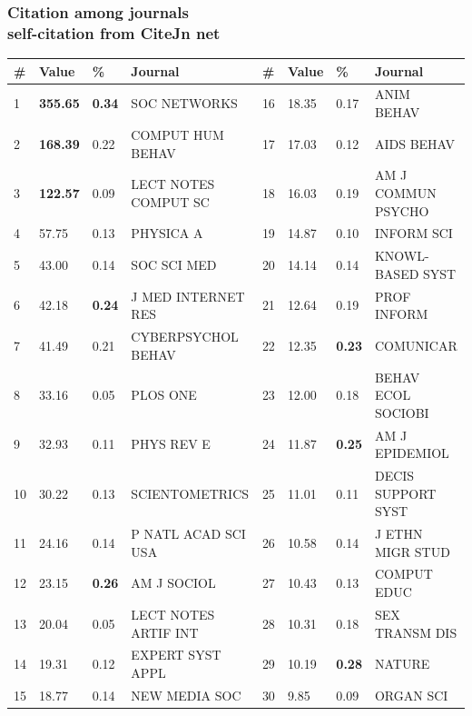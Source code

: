 \documentclass[hyperref={pdfstartview={FitBH -32768},
                         pdfpagemode=FullScreen,
                         plainpages=false,
                         colorlinks=true}
              ]{beamer}
\begin{document}
\begin{frame}[fragile]
\frametitle{Citation among journals\\ \normalsize self-citation from CiteJn net}

\renewcommand{\arraystretch}{0.95}
\tiny
\begin{center}
\begin{tabular}{p{0.1cm}|p{0.5cm}|p{0.3cm}|p{2.7cm}|p{0.1cm}|p{0.5cm}|p{0.3cm}|p{2.6cm}|} 
\# &	Value& \% &	Journal &  \# &	Value& \% & Journal \\ \hline 
1 &	\textbf{355.65}&	\textbf{0.34}&	SOC NETWORKS&	16&	       18.35 &    0.17	  &     ANIM BEHAV\\
2 &	\textbf{168.39}&	0.22&	COMPUT HUM BEHAV&	17&    17.03 & 	  0.12	  &     AIDS BEHAV\\
3 &	\textbf{122.57}&	0.09&	LECT NOTES COMPUT SC&	18&    16.03 & 	  0.19	  &     AM J COMMUN PSYCHO \\
4 &	57.75&	0.13&	PHYSICA A&	19&	       14.87 &	  0.10	  &     INFORM SCI\\
5 &	43.00&	0.14&	SOC SCI MED&	20&	       14.14 &	  0.14	  &     KNOWL-BASED SYST\\
6 &	42.18&	\textbf{0.24}&	J MED INTERNET RES&	21&    12.64 &	  0.19	  &     PROF INFORM\\
7 &	41.49&	0.21&	CYBERPSYCHOL BEHAV&	22&    12.35 & 	 \textbf{0.23}	  &     COMUNICAR\\
8 &	33.16&	0.05&	PLOS ONE&	23&	       12.00 & 	  0.18	  &     BEHAV ECOL SOCIOBI \\
9 &	32.93&	0.11&	PHYS REV E&	24&	       11.87 & 	  \textbf{0.25}	  &     AM J EPIDEMIOL\\
10 &	30.22&	0.13&	SCIENTOMETRICS&	25&	       11.01 & 	  0.11	  &     DECIS SUPPORT SYST \\
11 &	24.16&	0.14&	P NATL ACAD SCI USA&	26&    10.58 & 	  0.14	  &     J ETHN MIGR STUD\\
12 &	23.15&	\textbf{0.26}&	AM J SOCIOL&	27&	       10.43 & 	  0.13	  &     COMPUT EDUC\\
13 &	20.04&	0.05&	LECT NOTES ARTIF INT&	28&    10.31 & 	  0.18	  &     SEX TRANSM DIS\\
14 &	19.31&	0.12&	EXPERT SYST APPL&	29&    10.19 & 	 \textbf{0.28}	  &     NATURE\\
15 &	18.77&	0.14&	NEW MEDIA SOC&	30&	       9.85 & 	  0.09	  &     ORGAN SCI\\ \hline 
\end{tabular} 
\end{center}

\end{frame}
\end{document}
